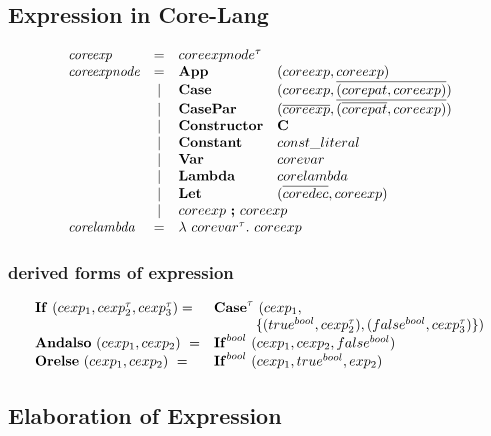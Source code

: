\documentclass[11pt,a4paper]{article}
\newcommand{\key}[1]{\textrm{\textbf{#1}}}
\newcommand{\prodlhs}[1]{\textit{#1}}
\newcommand{\braced}[1]{\{#1\}}
\newcommand{\lam}  {\mathbf\lambda}
\newcommand{\vcon} {\mathbf{C}}
\newcommand{\vect}[1]{\overline{#1}}
\begin{document}
\subsection {Expression in Core-Lang}
{\renewcommand{\arraystretch}{1.2}\[
\begin{array}{lcll}
\prodlhs{coreexp}
	& = & \multicolumn{2}{l}{coreexpnode^\tau}				    \\
\prodlhs{coreexpnode}
    & = & \key{App}     & (coreexp, coreexp)						\\
    & | & \key{Case}    & (coreexp, \vect{(corepat,coreexp)})   	\\
    & | & \key{CasePar} & (\vect{coreexp}, \vect{(\vect{corepat},coreexp)}) \\
    & | & \key{Constructor}& \vcon		                	\\
    & | & \key{Constant}	 & const\_literal        			\\
    & | & \key{Var}  		   & corevar     		    \\ 
    & | & \key{Lambda}  	 & corelambda						\\ 
    & | & \key{Let}			   & (\vect{coredec}, coreexp)			\\
    & | & \multicolumn{2}{l}{coreexp\ \key{;}\ coreexp}			\\
\prodlhs{corelambda}
	& = & \multicolumn{2}{l}{\lam\ corevar^\tau.\ coreexp}      \\
\end{array}
\]}

\subsubsection {derived forms of expression}
\[\begin{array}{ll}
  \key{If}\ (cexp_1, cexp_2^\tau, cexp_3^\tau) = & \key{Case}^\tau\ (cexp_1, \\
                                       & \hspace{7ex}\braced{(true^{bool}, cexp_2^\tau), (false^{bool}, cexp_3^\tau)})  \\
\key{Andalso}\ (cexp_1, cexp_2)\     = & \key{If}^{bool}\ (cexp_1, cexp_2, false^{bool}) \\
\key{Orelse} \ (cexp_1, cexp_2)\     = & \key{If}^{bool}\ (cexp_1, true^{bool}, exp_2)   \\
\end{array}\]

\subsection {Elaboration of Expression}
\end{document}
